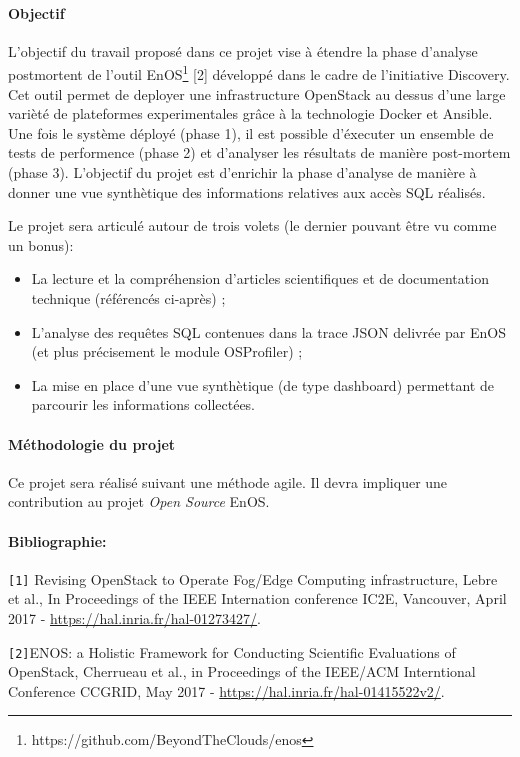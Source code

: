 \documentclass[a4paper,11pt]{article}
\begin{document}
\begin{note}
\paragraph*{Objectif\\}
L'objectif du travail proposé dans ce projet vise à étendre la phase
d'analyse postmortent de l'outil
EnOS\footnote{https://github.com/BeyondTheClouds/enos} [2] développé dans
le cadre de l'initiative Discovery. Cet outil permet de
deployer une infrastructure OpenStack au dessus d'une large varièté de
plateformes experimentales grâce à la technologie Docker et Ansible.
Une fois le système déployé (phase 1), il est possible d'éxecuter un ensemble de tests de performence (phase 2) et d'analyser les résultats de manière post-mortem (phase 3).
L'objectif du projet est d'enrichir la phase d'analyse de manière à donner une vue synthètique des informations relatives aux accès SQL réalisés.

Le projet sera articulé autour de trois volets (le dernier pouvant être vu comme un bonus):
\begin{itemize}
\item La lecture et la compréhension d'articles scientifiques et de documentation technique (référencés ci-après) ; 
\item L'analyse des requêtes SQL contenues dans la trace JSON delivrée par EnOS (et plus précisement le module OSProfiler) ; 
\item La mise en place d'une vue synthètique (de type dashboard) permettant de parcourir les informations collectées.  
\end{itemize}

\paragraph*{Méthodologie du projet\\}
Ce projet sera réalisé suivant une méthode agile. Il devra impliquer une
contribution au projet \emph{Open Source} EnOS.


\paragraph*{Bibliographie:\\}
%
\texttt{[1]} Revising OpenStack to Operate Fog/Edge Computing infrastructure, Lebre et al., In Proceedings of the IEEE Internation conference IC2E, Vancouver, April 2017 - \url{https://hal.inria.fr/hal-01273427/}.

\texttt{[2]}ENOS: a Holistic Framework for Conducting Scientific Evaluations of OpenStack, Cherrueau et al., in Proceedings of the IEEE/ACM Interntional Conference CCGRID, May 2017 - \url{https://hal.inria.fr/hal-01415522v2/}.

\end{note}
\end{document}

